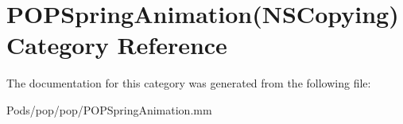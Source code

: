 \hypertarget{category_p_o_p_spring_animation_07_n_s_copying_08}{}\section{P\+O\+P\+Spring\+Animation(N\+S\+Copying) Category Reference}
\label{category_p_o_p_spring_animation_07_n_s_copying_08}


The documentation for this category was generated from the following file\+:\begin{DoxyCompactItemize}
\item 
Pods/pop/pop/P\+O\+P\+Spring\+Animation.\+mm\end{DoxyCompactItemize}
